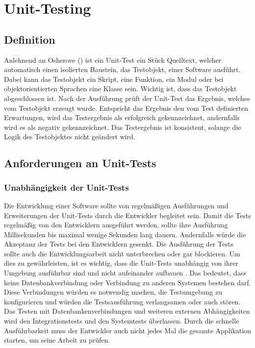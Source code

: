 \section{Unit-Testing}
\subsection{Definition}
Anlehnend an Osherove (\citeyear[S. 34]{Osherove2015}) ist ein \gls{Unit-Test} ein Stück Quelltext, welcher automatisch einen isolierten Baustein, das Testobjekt, einer Software ausführt. Dabei kann das Testobjekt ein Skript, eine Funktion, ein Modul oder bei objektorientierten Sprachen eine Klasse sein. Wichtig ist, dass das Testobjekt abgeschlossen ist. Nach der Ausführung prüft der Unit-Test das Ergebnis, welches vom Testobjekt erzeugt wurde. Entspricht das Ergebnis den vom Test definierten Erwartungen, wird das Testergebnis als erfolgreich gekennzeichnet, andernfalls wird es als negativ gekennzeichnet.
Das Testergebnis ist konsistent, solange die Logik des Testobjektes nicht geändert wird.

\subsection{Anforderungen an Unit-Tests}
\subsubsection*{Unabhängigkeit der Unit-Tests}
Die Entwicklung einer Software sollte von regelmäßigen Ausführungen und Erweiterungen der Unit-Tests durch die Entwickler begleitet sein. Damit die Tests regelmäßig von den Entwicklern ausgeführt werden, sollte ihre Ausführung Millisekunden bis maximal wenige Sekunden lang dauern. Andernfalls würde die Akzeptanz der Tests bei den Entwicklern gesenkt. Die Ausführung der Tests sollte auch die Entwicklungsarbeit nicht unterbrechen oder gar blockieren. Um dies zu gewährleisten, ist es wichtig, dass die Unit-Tests unabhängig von ihrer Umgebung ausführbar sind und nicht aufeinander aufbauen \autocite[vgl.][S. 19]{Springer2015}. Das bedeutet, dass keine Datenbankverbindung oder Verbindung zu anderen Systemen bestehen darf. Diese Verbindungen würden es notwendig machen, die Testumgebung zu konfigurieren und würden die Testsausführung verlangsamen oder auch stören. Das Testen mit Datenbankenverbindungen und weiteren externen Abhängigkeiten wird den Integrationstests und den Systemtests überlassen.
Durch die schnelle Ausführbarkeit muss der Entwickler auch nicht jedes Mal die gesamte Applikation starten, um seine Arbeit zu prüfen.
